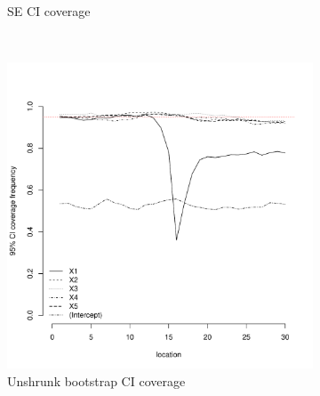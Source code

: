 \documentclass[authoryear, review, 11pt]{elsarticle}
\begin{document}
\begin{figure}
\begin{subfigure}[b]{0.45\textwidth}
		\caption{SE CI coverage}
	\end{subfigure}%
	\\%
	\begin{subfigure}[b]{0.45\textwidth}
	\centering
		\includegraphics[width=\textwidth]{../../figures/simulation/15.3.profile_unshrunk_bootstrap_coverage.pdf}
		\caption{Unshrunk bootstrap CI coverage}
	\end{subfigure}%
	~ %
	\begin{subfigure}[b]{0.45\textwidth}
	\centering

\end{subfigure}
\end{figure}
\end{document}
